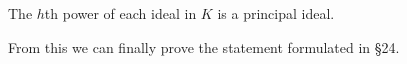 The $h$th power of each ideal in $K$ is a principal ideal.

From this we can finally prove the statement formulated in §24.
